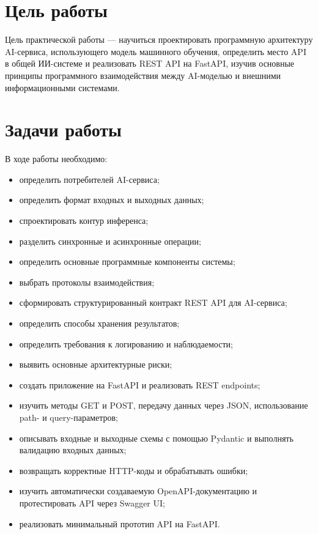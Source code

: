 \documentclass[12pt,a4paper]{article}
\begin{document}
\tableofcontents
\newpage

\section{Цель работы}

Цель практической работы — научиться проектировать программную архитектуру AI-сервиса, использующего модель машинного обучения, определить место API в общей ИИ-системе и реализовать REST API на FastAPI, изучив основные принципы программного взаимодействия между AI-моделью и внешними информационными системами.

\section{Задачи работы}

В ходе работы необходимо:

\begin{itemize}
    \item определить потребителей AI-сервиса;
    \item определить формат входных и выходных данных;
    \item спроектировать контур инференса;
    \item разделить синхронные и асинхронные операции;
    \item определить основные программные компоненты системы;
    \item выбрать протоколы взаимодействия;
    \item сформировать структурированный контракт REST API для AI-сервиса;
    \item определить способы хранения результатов;
    \item определить требования к логированию и наблюдаемости;
    \item выявить основные архитектурные риски;
    \item создать приложение на FastAPI и реализовать REST endpoints;
    \item изучить методы GET и POST, передачу данных через JSON, использование path- и query-параметров;
    \item описывать входные и выходные схемы с помощью Pydantic и выполнять валидацию входных данных;
    \item возвращать корректные HTTP-коды и обрабатывать ошибки;
    \item изучить автоматически создаваемую OpenAPI-документацию и протестировать API через Swagger UI;
    \item реализовать минимальный прототип API на FastAPI.
\end{itemize}
\end{document}
